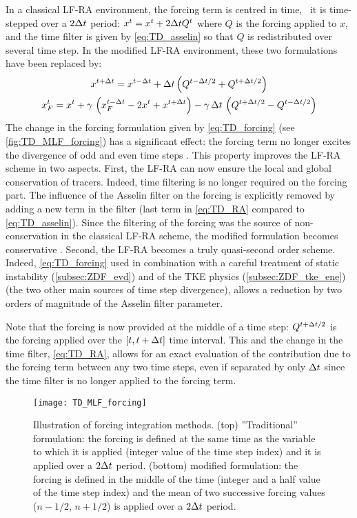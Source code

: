 \documentclass[../main/NEMO_manual]{subfiles}
\begin{document}
In a classical LF-RA environment,
the forcing term is centred in time, \ie\ it is time-stepped over a $2 \Delta t$ period:
$x^t = x^t + 2 \Delta t Q^t$ where $Q$ is the forcing applied to $x$,
and the time filter is given by \autoref{eq:TD_asselin} so that
$Q$ is redistributed over several time step.
In the modified LF-RA environment, these two formulations have been replaced by:
\begin{gather}
  \label{eq:TD_forcing}
  x^{t + \Delta t} = x^{t - \Delta t} + \Delta t \left( Q^{t - \Delta t / 2} + Q^{t + \Delta t / 2} \right)  \\
  \label{eq:TD_RA}
  x_F^t       = x^t + \gamma \, \left( x_F^{t - \Delta t} - 2 x^t + x^{t + \Delta t} \right)
                    - \gamma \, \Delta t \, \left( Q^{t + \Delta t / 2} - Q^{t - \Delta t / 2} \right)
\end{gather}
The change in the forcing formulation given by \autoref{eq:TD_forcing}
(see \autoref{fig:TD_MLF_forcing}) has a significant effect:
the forcing term no longer excites the divergence of odd and even time steps
\citep{leclair.madec_OM09}.
This property improves the LF-RA scheme in two aspects.
First, the LF-RA can now ensure the local and global conservation of tracers.
Indeed, time filtering is no longer required on the forcing part.
The influence of the Asselin filter on the forcing is explicitly removed by
adding a new term in the filter (last term in \autoref{eq:TD_RA} compared to \autoref{eq:TD_asselin}).
Since the filtering of the forcing was the source of non-conservation in the classical LF-RA scheme,
the modified formulation becomes conservative \citep{leclair.madec_OM09}.
Second, the LF-RA becomes a truly quasi-second order scheme.
Indeed, \autoref{eq:TD_forcing} used in combination with a careful treatment of static instability
(\autoref{subsec:ZDF_evd}) and of the TKE physics (\autoref{subsec:ZDF_tke_ene})
(the two other main sources of time step divergence),
allows a reduction by two orders of magnitude of the Asselin filter parameter.

Note that the forcing is now provided at the middle of a time step:
$Q^{t + \Delta t / 2}$ is the forcing applied over the $[t,t + \Delta t]$ time interval.
This and the change in the time filter, \autoref{eq:TD_RA},
allows for an exact evaluation of the contribution due to the forcing term between any two time steps,
even if separated by only $\Delta t$ since the time filter is no longer applied to the forcing term.

\begin{figure}
  \centering
  \texttt{[image: TD\_MLF\_forcing]}
  \caption[Forcing integration methods for modified leapfrog (top and bottom)]{
    Illustration of forcing integration methods.
    (top) ''Traditional'' formulation:
    the forcing is defined at the same time as the variable to which it is applied
    (integer value of the time step index) and it is applied over a $2 \Delta t$ period.
    (bottom)  modified formulation:
    the forcing is defined in the middle of the time
    (integer and a half value of the time step index) and
    the mean of two successive forcing values ($n - 1 / 2$, $n + 1 / 2$) is applied over
    a $2 \Delta t$ period.}
  \label{fig:TD_MLF_forcing}
\end{figure}
\end{document}
